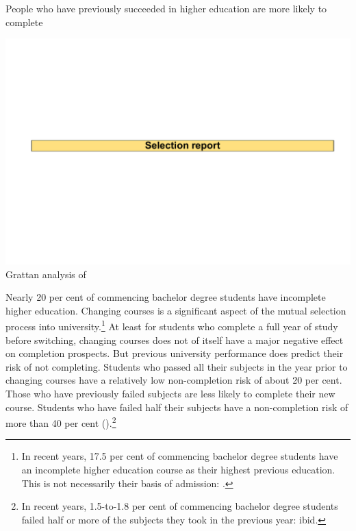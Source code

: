 {                %
                    \caption{People who have previously succeeded in higher education are more likely to complete \label{fig:14}}%
                    \includegraphics[page=19]{atlas/selection_chartdeck.pdf} 
                    {Grattan analysis of \textcite{DepartmentofEducationandTraininga}}
                }

Nearly 20 per cent of commencing bachelor degree students have incomplete higher education. Changing courses is a significant aspect of the mutual selection process into university.\footnote{In recent years, 17.5 per cent of commencing bachelor degree students have an incomplete higher education course as their highest previous education. This is not necessarily their basis of admission: \textcite{DepartmentofEducationandTraininga}.} 
At least for students who complete a full year of study before switching, changing courses does not of itself have a major negative effect on completion prospects. But previous university performance does predict their risk of not completing. Students who passed all their subjects in the year prior to changing courses have a relatively low non-completion risk of about 20 per cent. Those who have previously failed subjects are less likely to complete their new course. Students who have failed half their subjects have a non-completion risk of more than 40 per cent ().\footnote{In recent years, 1.5-to-1.8 per cent of commencing bachelor degree students failed half or more of the subjects they took in the previous year: ibid.}

